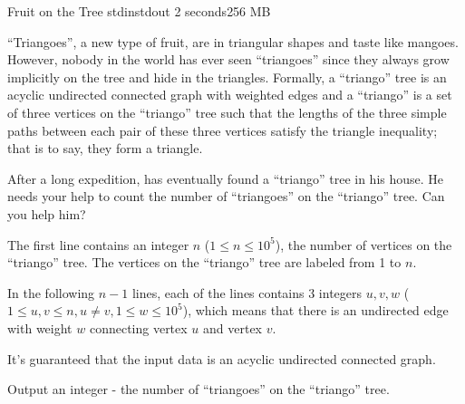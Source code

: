 
\begin{problem}{Fruit on the Tree}
{stdin}{stdout}
{2 seconds}{256 MB}{}

``Triangoes'', a new type of fruit, are in triangular shapes and taste like mangoes. However, nobody in the world has ever seen ``triangoes'' since they always grow implicitly on the tree and hide in the triangles. Formally, a ``triango'' tree is an acyclic undirected connected graph with weighted edges and a ``triango'' is a set of three vertices on the ``triango'' tree such that the lengths of the three simple paths between each pair of these three vertices satisfy the triangle inequality; that is to say, they form a triangle.

After a long expedition, \Suzukaze has eventually found a ``triango'' tree in his house. He needs your help to count the number of ``triangoes'' on the ``triango'' tree. Can you help him?

\InputFile

The first line contains an integer $n$ ($1 \le n \le 10^5$), the number of vertices on the ``triango'' tree. The vertices on the ``triango'' tree are labeled from 1 to $n$.

In the following $n-1$ lines, each of the lines contains 3 integers $u, v, w$ ($1 \le u,v \le n, u \neq v, 1 \le w \le 10^5$), which means that there is an undirected edge with weight $w$ connecting vertex $u$ and vertex $v$.

It's guaranteed that the input data is an acyclic undirected connected graph.

\OutputFile

Output an integer - the number of ``triangoes'' on the ``triango'' tree.

\Examples

\begin{example}
%
\end{example}

\end{problem}
